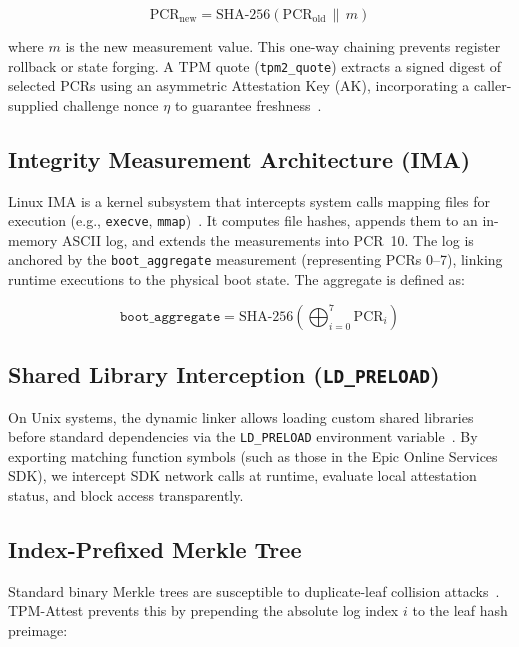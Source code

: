 \documentclass[11pt]{article}
\begin{document}
\begin{equation}
  \text{PCR}_{\text{new}} = \text{SHA-256}\!\left(\text{PCR}_{\text{old}} \,\|\, m\right)
  \label{eq:pcr-extend}
\end{equation}

\noindent where $m$ is the new measurement value. This one-way chaining prevents register rollback or state forging. A TPM quote (\texttt{tpm2\_quote}) extracts a signed digest of selected PCRs using an asymmetric Attestation Key (AK), incorporating a caller-supplied challenge nonce $\eta$ to guarantee freshness~\cite{tpm2tools2024}.

\subsection{Integrity Measurement Architecture (IMA)}
Linux IMA is a kernel subsystem that intercepts system calls mapping files for execution (e.g., \texttt{execve}, \texttt{mmap})~\cite{lko2021}. It computes file hashes, appends them to an in-memory ASCII log, and extends the measurements into PCR~10. The log is anchored by the \texttt{boot\_aggregate} measurement (representing PCRs 0--7), linking runtime executions to the physical boot state. The aggregate is defined as:

\begin{equation}
  \texttt{boot\_aggregate} = \text{SHA-256}\!\left(\bigoplus_{i=0}^{7} \text{PCR}_i\right)
  \label{eq:boot-agg}
\end{equation}

\subsection{Shared Library Interception (\texttt{LD\_PRELOAD})}
On Unix systems, the dynamic linker allows loading custom shared libraries before standard dependencies via the \texttt{LD\_PRELOAD} environment variable~\cite{kerrisk2010}. By exporting matching function symbols (such as those in the Epic Online Services SDK), we intercept SDK network calls at runtime, evaluate local attestation status, and block access transparently.

\subsection{Index-Prefixed Merkle Tree}
Standard binary Merkle trees are susceptible to duplicate-leaf collision attacks~\cite{bitcoin2012cve}. TPM-Attest prevents this by prepending the absolute log index $i$ to the leaf hash preimage:
\end{document}
